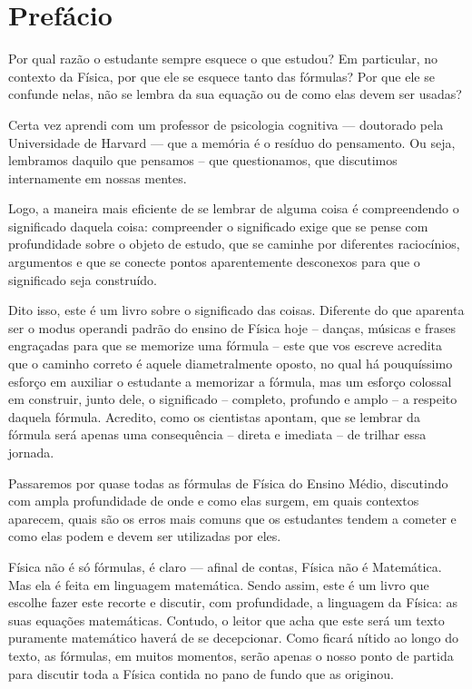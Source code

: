 \chapter*{Prefácio} 

Por qual razão o estudante sempre esquece o que estudou? Em particular, no contexto da Física, por que ele se esquece tanto das fórmulas? Por que ele se confunde nelas, não se lembra da sua equação ou de como elas devem ser usadas?

Certa vez aprendi com um professor de psicologia cognitiva --- doutorado pela Universidade de Harvard --- que a memória é o resíduo do pensamento. Ou seja, lembramos daquilo que pensamos -- que questionamos, que discutimos internamente em nossas mentes.


Logo, a maneira mais eficiente de se lembrar de alguma coisa é compreendendo o significado daquela coisa: compreender o significado exige que se pense com profundidade sobre o objeto de estudo, que se caminhe por diferentes raciocínios, argumentos e que se conecte pontos aparentemente desconexos para que o significado seja construído.

Dito isso, este é um livro sobre o significado das coisas. Diferente do que aparenta ser o modus operandi padrão do ensino de Física hoje -- danças, músicas e frases engraçadas para que se memorize uma fórmula -- este que vos escreve acredita que o caminho correto é aquele diametralmente oposto, no qual há pouquíssimo esforço em auxiliar o estudante a memorizar a fórmula, mas um esforço colossal em construir, junto dele, o significado -- completo, profundo e amplo -- a respeito daquela fórmula. Acredito, como os cientistas apontam, que se lembrar da fórmula será apenas uma consequência -- direta e imediata -- de trilhar essa jornada.

Passaremos por quase todas as fórmulas de Física do Ensino Médio, discutindo com ampla profundidade de onde e como elas surgem, em quais contextos aparecem, quais são os erros mais comuns que os estudantes tendem a cometer e como elas podem e devem ser utilizadas por eles.

Física não é só fórmulas, é claro --- afinal de contas, Física não é Matemática. Mas ela é feita em linguagem matemática. Sendo assim, este é um livro que escolhe fazer este recorte e discutir, com profundidade, a linguagem da Física: as suas equações matemáticas. Contudo, o leitor que acha que este será um texto puramente matemático haverá de se decepcionar. Como ficará nítido ao longo do texto, as fórmulas, em muitos momentos, serão apenas o nosso ponto de partida para discutir toda a Física contida no pano de fundo que as originou.


